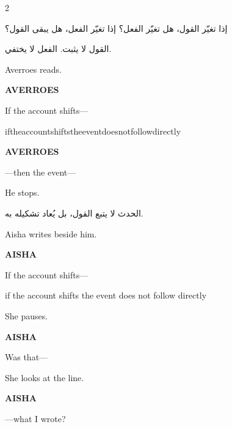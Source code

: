 \begin{paracol}{2}

\switchcolumn*

\begin{AR}
إذا تغيّر القول، هل تغيّر الفعل؟
إذا تغيّر الفعل، هل يبقى القول؟

القول لا يثبت.
الفعل لا يختفي.
\end{AR}

\medskip

\switchcolumn

Averroes reads.

\medskip

\textbf{AVERROES}

If the account shifts---

\medskip

{\Clypto iftheaccountshiftstheeventdoesnotfollowdirectly}

\medskip

\textbf{AVERROES}

---then the event---

\medskip

He stops.

\medskip

\switchcolumn*

\begin{AR}
الحدث لا يتبع القول، بل يُعاد تشكيله به.
\end{AR}

\medskip

\switchcolumn

Aisha writes beside him.

\medskip

\textbf{AISHA}

If the account shifts---

\medskip

{\Clypto if the account shifts the event does not follow directly}

\medskip

She pauses.

\medskip

\textbf{AISHA}

Was that---

\medskip

She looks at the line.

\medskip

\textbf{AISHA}

---what I wrote?

\medskip

\switchcolumn*


\end{paracol}
